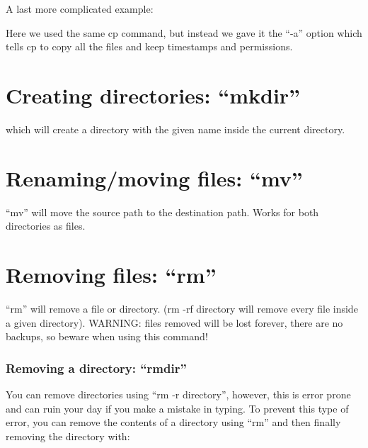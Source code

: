 A last more complicated example:
\begin{prompt}
\end{prompt}

Here we used the same cp command, but instead we gave it the ``-a'' option
which tells cp to copy all the files and keep timestamps and permissions.

\section{Creating directories: ``mkdir''}

\begin{prompt}
\end{prompt}

which will create a directory with the given name inside the current directory.

\section{Renaming/moving files: ``mv''}

\begin{prompt}
\end{prompt}

``mv'' will move the source path to the destination path. Works for both directories as files.

\section{Removing files: ``rm''}


\begin{prompt}
\end{prompt}

``rm'' will remove a file or directory. (rm -rf directory will remove every
file inside a given directory). WARNING: files removed will be lost forever,
there are no backups, so beware when using this command!

\subsubsection{Removing a directory: ``rmdir''}

You can remove directories using ``rm -r directory'', however, this is error
prone and can ruin your day if you make a mistake in typing. To prevent this
type of error, you can remove the contents of a directory using ``rm''
and then finally removing the directory with:

